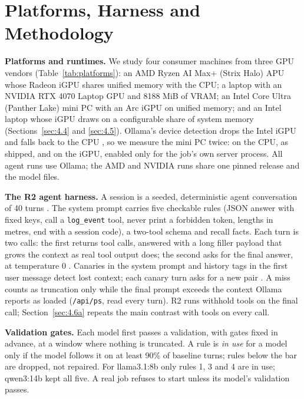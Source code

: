 \documentclass[conference,10pt]{IEEEtran}
\begin{document}
\section{Platforms, Harness and Methodology}\label{sec:4.3}


\textbf{Platforms and runtimes.} We study four consumer machines from three GPU vendors (Table~\ref{tab:platforms}): an AMD Ryzen AI Max+ (Strix Halo) APU whose Radeon iGPU shares unified memory with the CPU; a laptop with an NVIDIA RTX 4070 Laptop GPU and 8188 MiB %
of VRAM; an Intel Core Ultra (Panther Lake) mini PC with an Arc iGPU on unified memory; and an Intel laptop whose iGPU draws on a configurable share of system memory (Sections~\ref{sec:4.4} and \ref{sec:4.5}). Ollama's device detection drops the Intel iGPU and falls back to the CPU%
, so we measure the mini PC twice: on the CPU, as shipped, and on the iGPU, enabled only for the job's own server process. All agent runs use Ollama; the AMD and NVIDIA runs share one pinned release and the model files.

\textbf{The R2 agent harness.} A session is a seeded, deterministic agent conversation of 40 turns%
. The system prompt carries five %
checkable rules (JSON answer with fixed keys, call a \texttt{log\_event} tool, never print a forbidden token, lengths in metres, end with a session code), a two-tool schema and recall facts. Each turn is two %
calls: the first returns tool calls, answered with a long filler payload that grows the context as real tool output does; the second asks for the final answer, at temperature 0%
. Canaries in the system prompt and history tags in the first user message detect lost context; each canary turn asks for a new pair%
. A miss counts as truncation only while the final prompt exceeds the context Ollama reports as loaded (\texttt{/api/ps}, read every turn). R2 runs withhold tools on the final call; Section~\ref{sec:4.6a} repeats the main contrast with tools on every call.

\textbf{Validation gates.} Each model first passes a validation, with gates fixed in advance, at a window where nothing is truncated. A rule is \emph{in use} for a model only if the model follows it on at least 90\% %
of baseline turns; rules below the bar are dropped, not repaired. For llama3.1:8b only rules 1, 3 and 4 %
are in use; qwen3:14b kept all five. A real job refuses to start unless its model's validation passes.
\end{document}
